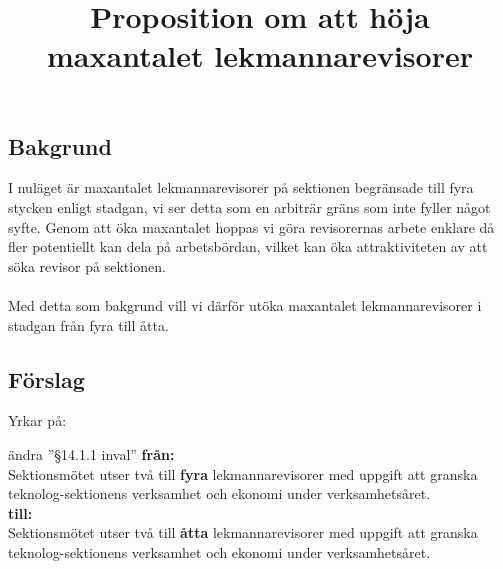 \documentclass[11pt, noincludeaddress, nopagination]{classes/cthit}
\begin{document}
\title{Proposition om att höja maxantalet lekmannarevisorer}

\makeheadfoot%

\makesimpletitle

\subsection*{Bakgrund}
I nuläget är maxantalet lekmannarevisorer på sektionen begränsade till fyra stycken enligt stadgan, vi ser detta som en arbiträr gräns som inte fyller något syfte. 
Genom att öka maxantalet hoppas vi göra revisorernas arbete enklare då fler potentiellt kan dela på arbetsbördan, vilket kan öka attraktiviteten av att söka revisor på sektionen. 
\\\\
Med detta som bakgrund vill vi därför utöka maxantalet lekmannarevisorer i stadgan från fyra till åtta. 
\subsection*{Förslag}
Yrkar på:
\begin{att}
    \item ändra ''§14.1.1 inval'' \textbf{från:} \\
    Sektionsmötet utser två till \textbf{fyra} lekmannarevisorer med uppgift att granska teknolog-sektionens verksamhet och ekonomi under verksamhetsåret.\\
    \textbf{till:} \\
    Sektionsmötet utser två till \textbf{åtta} lekmannarevisorer med uppgift att granska teknolog-sektionens verksamhet och ekonomi under verksamhetsåret.
\end{att}
\end{document}
